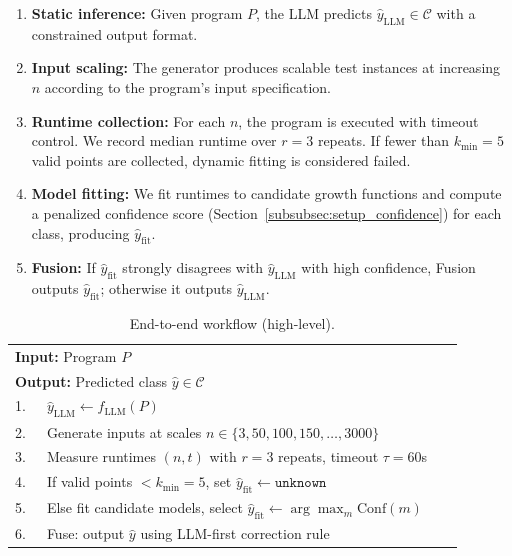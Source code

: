 \documentclass[conference]{IEEEtran}
\begin{document}
 \begin{enumerate} 
     \item \textbf{Static inference:} Given program $P$, the LLM predicts $\hat{y}_{\text{LLM}} \in \mathcal{C}$ with a constrained output format. 
     \item \textbf{Input scaling:} The generator produces scalable test instances at increasing $n$ according to the program's input specification. 
     \item \textbf{Runtime collection:} For each $n$, the program is executed with timeout control. We record median runtime over $r=3$ repeats. 
           If fewer than $k_{\min}=5$ valid points are collected, dynamic fitting is considered failed. 
     \item \textbf{Model fitting:} We fit runtimes to candidate growth functions and compute a penalized confidence score 
           (Section~\ref{subsubsec:setup_confidence}) for each class, producing $\hat{y}_{\text{fit}}$. 
     \item \textbf{Fusion:} If $\hat{y}_{\text{fit}}$ strongly disagrees with $\hat{y}_{\text{LLM}}$ with high confidence, 
           Fusion outputs $\hat{y}_{\text{fit}}$; otherwise it outputs $\hat{y}_{\text{LLM}}$. 
 \end{enumerate} 
 
 \begin{table}[t] 
 \caption{End-to-end workflow (high-level).} 
 \label{alg:workflow} 
 \centering 
 \begin{tabular}{p{0.95\linewidth}} 
 \hline 
 \textbf{Input:} Program $P$ \\ 
 \textbf{Output:} Predicted class $\hat{y} \in \mathcal{C}$ \\ 
 \hline 
 1.\ \ \ $\hat{y}_{\text{LLM}} \leftarrow f_{\text{LLM}}(P)$ \\ 
 2.\ \ \ Generate inputs at scales $n \in \{3,50,100,150,\dots,3000\}$ \\ 
 3.\ \ \ Measure runtimes $(n,t)$ with $r=3$ repeats, timeout $\tau=60$s \\ 
 4.\ \ \ If valid points $< k_{\min}=5$, set $\hat{y}_{\text{fit}} \leftarrow \texttt{unknown}$ \\ 
 5.\ \ \ Else fit candidate models, select $\hat{y}_{\text{fit}} \leftarrow \arg\max_m \mathrm{Conf}(m)$ \\ 
 6.\ \ \ Fuse: output $\hat{y}$ using LLM-first correction rule \\ 
 \hline 
 \end{tabular} 
 \end{table} 
 
\end{document}
